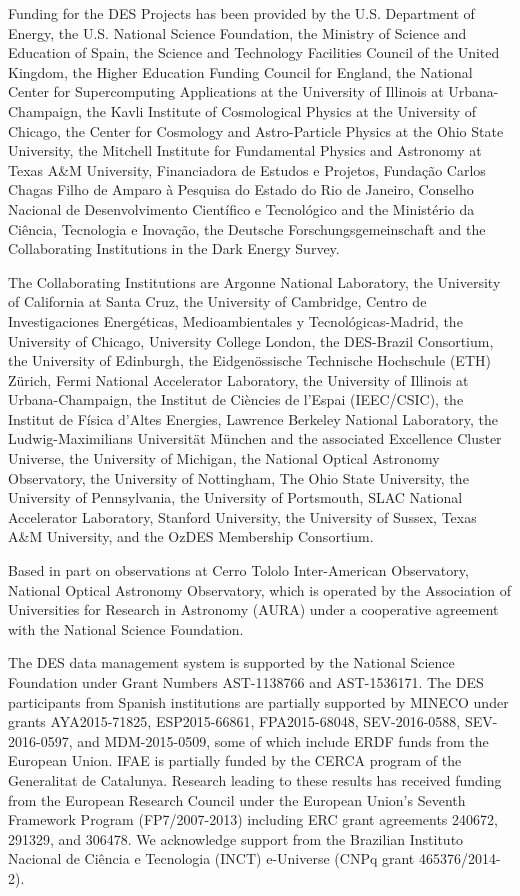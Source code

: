 \documentclass[fleqn,usenatbib,]{mnras}
\begin{document}
Funding for the DES Projects has been provided by the U.S. Department of Energy, the U.S. National Science Foundation, the Ministry of Science and Education of Spain, 
the Science and Technology Facilities Council of the United Kingdom, the Higher Education Funding Council for England, the National Center for Supercomputing 
Applications at the University of Illinois at Urbana-Champaign, the Kavli Institute of Cosmological Physics at the University of Chicago, 
the Center for Cosmology and Astro-Particle Physics at the Ohio State University,
the Mitchell Institute for Fundamental Physics and Astronomy at Texas A\&M University, Financiadora de Estudos e Projetos, 
Funda{\c c}{\~a}o Carlos Chagas Filho de Amparo {\`a} Pesquisa do Estado do Rio de Janeiro, Conselho Nacional de Desenvolvimento Cient{\'i}fico e Tecnol{\'o}gico and 
the Minist{\'e}rio da Ci{\^e}ncia, Tecnologia e Inova{\c c}{\~a}o, the Deutsche Forschungsgemeinschaft and the Collaborating Institutions in the Dark Energy Survey. 

The Collaborating Institutions are Argonne National Laboratory, the University of California at Santa Cruz, the University of Cambridge, Centro de Investigaciones Energ{\'e}ticas, 
Medioambientales y Tecnol{\'o}gicas-Madrid, the University of Chicago, University College London, the DES-Brazil Consortium, the University of Edinburgh, 
the Eidgen{\"o}ssische Technische Hochschule (ETH) Z{\"u}rich, 
Fermi National Accelerator Laboratory, the University of Illinois at Urbana-Champaign, the Institut de Ci{\`e}ncies de l'Espai (IEEC/CSIC), 
the Institut de F{\'i}sica d'Altes Energies, Lawrence Berkeley National Laboratory, the Ludwig-Maximilians Universit{\"a}t M{\"u}nchen and the associated Excellence Cluster Universe, 
the University of Michigan, the National Optical Astronomy Observatory, the University of Nottingham, The Ohio State University, the University of Pennsylvania, the University of Portsmouth, 
SLAC National Accelerator Laboratory, Stanford University, the University of Sussex, Texas A\&M University, and the OzDES Membership Consortium.

Based in part on observations at Cerro Tololo Inter-American Observatory, National Optical Astronomy Observatory, which is operated by the Association of 
Universities for Research in Astronomy (AURA) under a cooperative agreement with the National Science Foundation.

The DES data management system is supported by the National Science Foundation under Grant Numbers AST-1138766 and AST-1536171.
The DES participants from Spanish institutions are partially supported by MINECO under grants AYA2015-71825, ESP2015-66861, FPA2015-68048, SEV-2016-0588, SEV-2016-0597, and MDM-2015-0509, 
some of which include ERDF funds from the European Union. IFAE is partially funded by the CERCA program of the Generalitat de Catalunya.
Research leading to these results has received funding from the European Research
Council under the European Union's Seventh Framework Program (FP7/2007-2013) including ERC grant agreements 240672, 291329, and 306478.
We  acknowledge support from the Brazilian Instituto Nacional de Ci\^encia
e Tecnologia (INCT) e-Universe (CNPq grant 465376/2014-2).
\end{document}
